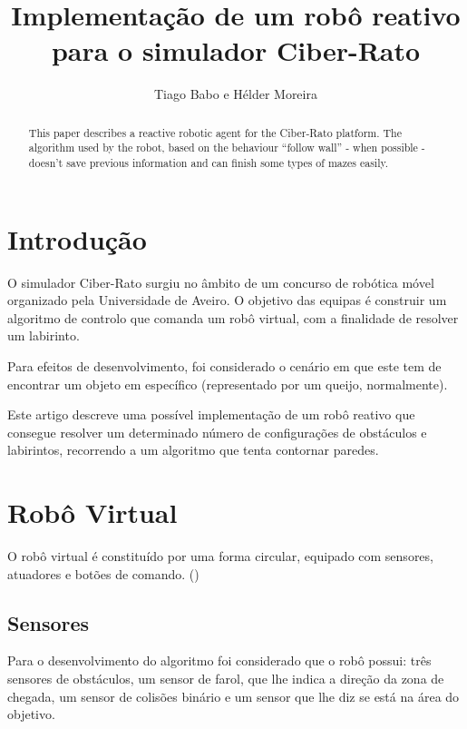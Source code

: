 \documentclass[citeauthoryear]{llncs} %
\begin{document}
\title{Implementação de um robô reativo para o simulador Ciber-Rato}
\author{Tiago Babo e Hélder Moreira}


\maketitle

\begin{abstract}
This paper describes a reactive robotic agent for the Ciber-Rato platform. The algorithm used by the robot, based on the behaviour “follow wall” - when possible - doesn't save previous information and can finish some types of mazes easily.
\end{abstract}

\section{Introdução}
O simulador Ciber-Rato surgiu no âmbito de um concurso de robótica móvel organizado pela Universidade de Aveiro. O objetivo das equipas é construir um algoritmo de controlo que comanda um robô virtual, com a finalidade de resolver um labirinto. 

Para efeitos de desenvolvimento, foi considerado o cenário em que este tem de encontrar um objeto em específico (representado por um queijo, normalmente).

Este artigo descreve uma possível implementação de um robô reativo que consegue resolver um determinado número de configurações de obstáculos e labirintos, recorrendo a um algoritmo que tenta contornar paredes. 

\section{Robô Virtual}

O robô virtual é constituído por uma forma circular, equipado com sensores, atuadores e botões de comando. (\cite{microrato})

\subsection{Sensores}
Para o desenvolvimento do algoritmo foi considerado que o robô possui: três sensores de obstáculos, um sensor de farol, que lhe indica a direção da zona de chegada, um sensor de colisões binário e um sensor que lhe diz se está na área do objetivo. 
\end{document}
